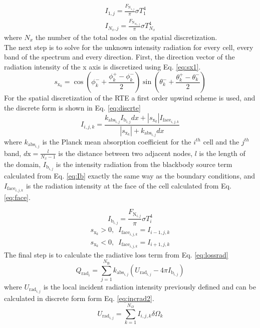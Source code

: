 \documentclass{warpdoc}
\begin{document}
\begin{equation} \begin{split} I_{1,j}=\frac{F_{\text{N}_{1,j}}}{\pi} \sigma T_1^4 \\ I_{N_x,j}=\frac{F_{\text{N}_{N_x,j}}}{\pi} \sigma T_{N_x}^4 \end{split} \end{equation}
where $N_x$ the number of the total nodes on the spatial discretization.\\
The next step is to solve for the unknown intensity radiation for every cell, every band of the spectrum and every direction. First, the direction vector of the radiation intensity of the x axis is discretized using Eq. \eqref{eq:sx1}.
\begin{equation} s_{\text{x}_k}=\cos\left(\phi_k^-+\frac{\phi_k^+-\phi_k^-}{2}\right)\sin\left(\theta_k^-+\frac{\theta_k^+-\theta_k^-}{2}\right) \label{eq:sx1}\end{equation}
For the spatial discretization of the RTE a first order upwind scheme is used, and the discrete form is shown in Eq. \eqref{eq:discrte}
\begin{equation}  I_{i,j,k}=\frac{k_{\text{abs}_{i,j}}I_{\text{b}_{i,j}} dx+|s_{\text{x}_k}|I_{\text{face}_{i,j,k}}}{|s_{\text{x}_k}|+k_{\text{abs}_{i,j}}dx} 
\label{eq:discrte} \end{equation}
where $k_{\text{abs}_{i,j}}$ is the Planck mean absorption coefficient for the $i^{th}$ cell and the $j^{th}$ band, $d\text{x}=\frac{l}{N_x-1}$ is the distance between two adjacent nodes, $l$ is the length of the domain, $I_{\text{b}_{i,j}}$ is the intensity radiation from the blackbody source term calculated from Eq. \eqref{eq:Ib} exactly the same way as the boundary conditions, and $I_{\text{face}_{i,j,k}}$ is the radiation intensity at the face of the cell calculated from Eq. \eqref{eq:face}. 

\begin{equation}
    I_{\text{b}_{i,j}}=\frac{F_{\text{N}_{i,j}}}{\pi} \sigma T_i^4
    \label{eq:Ib}
\end{equation}
\begin{equation}
    \begin{split}
       s_{\text{x}_k}>0,\enspace I_{\text{face}_{i,j,k}}=I_{i-1,j,k} \\ s_{\text{x}_k}<0,\enspace I_{\text{face}_{i,j,k}}=I_{i+1,j,k}
       \label{eq:face}
    \end{split}
\end{equation}
The final step is to calculate the radiative loss term from Eq. \eqref{eq:lossrad}
\begin{equation} Q_{\text{rad}_i}=\sum_{j=1}^{N_\text{B}} k_{\text{abs}_{i,j}}(U_{\text{rad}_{i,j}}-4\pi I_{\text{b}_{i,j}}) \label{eq:lossrad}\end{equation}
where  $U_{\text{rad}_{i,j}}$ is the local incident radiation intensity previously defined and can be calculated in discrete form form Eq. \eqref{eq:incrad2}.
\begin{equation} U_{\text{rad}_{i,j}}=\sum_{k=1}^{N_{\Omega}} I_{i,j,k}\delta  \Omega_k
\label{eq:incrad2}
\end{equation}
\end{document}
